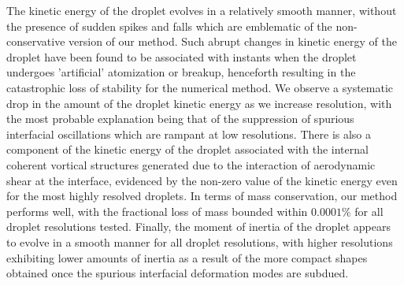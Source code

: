 The kinetic energy of the droplet evolves in a relatively smooth manner, without the presence of sudden spikes and falls which are emblematic of the non-conservative version of our method. Such abrupt changes in kinetic energy of the droplet have been found to be associated with instants when the droplet undergoes 'artificial' atomization or breakup, henceforth resulting in the catastrophic loss of stability for the numerical method. We observe a systematic drop in the amount of the droplet kinetic energy as we increase resolution, with the most probable explanation being that of the suppression of spurious interfacial oscillations which are rampant at low resolutions. There is also a component of the kinetic energy of the droplet associated with the internal coherent vortical structures generated due to the interaction of aerodynamic shear at the interface, evidenced by the non-zero value of the kinetic energy even for the most highly resolved droplets. In terms of mass conservation, our method performs well, with the fractional loss of mass bounded within $0.0001 \%$ for all droplet resolutions tested. Finally, the moment of inertia of the droplet appears to evolve in a smooth manner for all droplet resolutions, with higher resolutions exhibiting lower amounts of inertia as a result of the more compact shapes obtained once the spurious interfacial deformation modes are subdued.          





